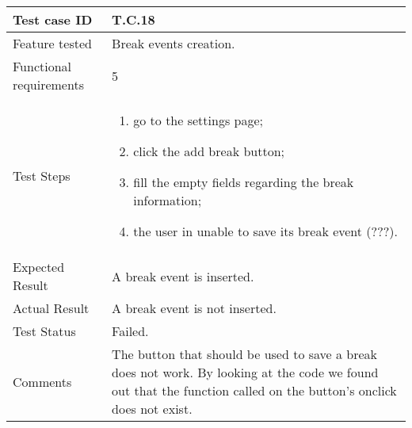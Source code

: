 \begin{table}[H]
	\begin{center}
		\begin{tabular}{ | p{} | p{} | }
		\hline
		Test case ID & T.C.18\\
		\hline
		Feature tested & Break events creation.\\
    	\hline
		Functional requirements & 5  \\
		\hline
		Test Steps & 
			\begin{enumerate}
				\item go to the settings page;
				\item click the add break button;
				\item fill the empty fields regarding the break information;
				\item the user in unable to save its break event (???).
			\end{enumerate} \\
		\hline
		Expected Result & A break event is inserted.\\
		\hline
		Actual Result & A break event is not inserted.\\ 
		\hline
		Test Status & \color{Red}Failed.\\ 
		\hline
		Comments & The button that should be used to save a break does not work. By looking at the code we found out that the function called on the button's onclick does not exist.\\
		\hline
		
		\end{tabular}
	\end{center}
\end{table}

